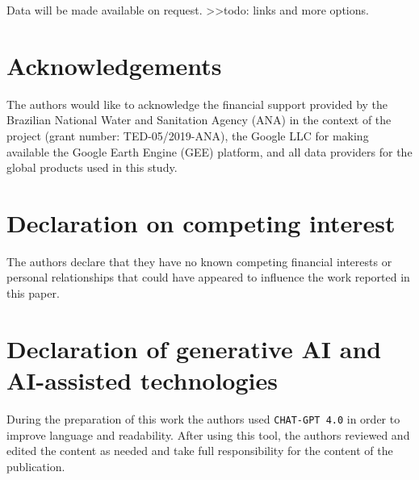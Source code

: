 \documentclass[12pt]{article}
\begin{document}
\noindent Data will be made available on request. >>todo: links and more options.

\section*{Acknowledgements}

\noindent \par The authors would like to acknowledge the financial support provided by the Brazilian National Water and Sanitation Agency (ANA) in the context of the project  (grant number: TED-05/2019-ANA), the Google LLC for making available the Google Earth Engine (GEE) platform, and all data providers for the global products used in this study.

\section*{Declaration on competing interest}

\noindent The authors declare that they have no known competing financial interests or personal relationships that could have appeared to influence the work reported in this paper.

\section*{Declaration of generative AI and AI-assisted technologies}

\noindent During the preparation of this work the authors used \texttt{CHAT-GPT 4.0} in order to improve language and readability. After using this tool, the authors reviewed and edited the content as needed and take full responsibility for the content of the publication.
\end{document}
